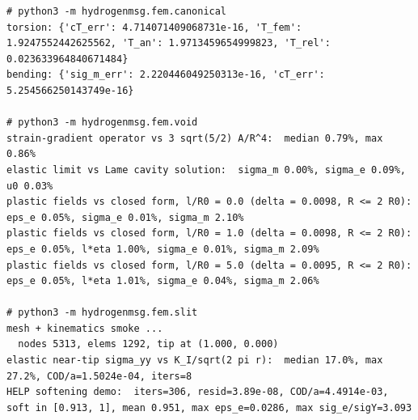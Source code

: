 \documentclass[11pt]{article}
\begin{document}
\noindent\begin{minipage}{\textwidth}
\begin{lstlisting}[style=termout]
# python3 -m hydrogenmsg.fem.canonical
torsion: {'cT_err': 4.714071409068731e-16, 'T_fem': 1.9247552442625562, 'T_an': 1.9713459654999823, 'T_rel': 0.023633964840671484}
bending: {'sig_m_err': 2.220446049250313e-16, 'cT_err': 5.254566250143749e-16}

# python3 -m hydrogenmsg.fem.void
strain-gradient operator vs 3 sqrt(5/2) A/R^4:  median 0.79%, max 0.86%
elastic limit vs Lame cavity solution:  sigma_m 0.00%, sigma_e 0.09%, u0 0.03%
plastic fields vs closed form, l/R0 = 0.0 (delta = 0.0098, R <= 2 R0):  eps_e 0.05%, sigma_e 0.01%, sigma_m 2.10%
plastic fields vs closed form, l/R0 = 1.0 (delta = 0.0098, R <= 2 R0):  eps_e 0.05%, l*eta 1.00%, sigma_e 0.01%, sigma_m 2.09%
plastic fields vs closed form, l/R0 = 5.0 (delta = 0.0095, R <= 2 R0):  eps_e 0.05%, l*eta 1.01%, sigma_e 0.04%, sigma_m 2.06%

# python3 -m hydrogenmsg.fem.slit
mesh + kinematics smoke ...
  nodes 5313, elems 1292, tip at (1.000, 0.000)
elastic near-tip sigma_yy vs K_I/sqrt(2 pi r):  median 17.0%, max 27.2%, COD/a=1.5024e-04, iters=8
HELP softening demo:  iters=306, resid=3.89e-08, COD/a=4.4914e-03, soft in [0.913, 1], mean 0.951, max eps_e=0.0286, max sig_e/sigY=3.093
\end{lstlisting}
\end{minipage}
\end{document}
